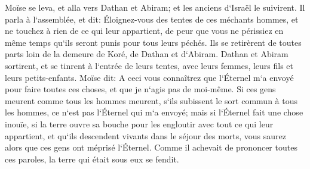 \verse Moïse se leva, et alla vers Dathan et Abiram; et les anciens d`Israël le suivirent. 
\verse Il parla à l`assemblée, et dit: Éloignez-vous des tentes de ces méchants hommes, et ne touchez à rien de ce qui leur appartient, de peur que vous ne périssiez en même temps qu`ils seront punis pour tous leurs péchés. 
\verse Ils se retirèrent de toutes parts loin de la demeure de Koré, de Dathan et d`Abiram. Dathan et Abiram sortirent, et se tinrent à l`entrée de leurs tentes, avec leurs femmes, leurs fils et leurs petits-enfants. 
\verse Moïse dit: A ceci vous connaîtrez que l`Éternel m`a envoyé pour faire toutes ces choses, et que je n`agis pas de moi-même. 
\verse Si ces gens meurent comme tous les hommes meurent, s`ils subissent le sort commun à tous les hommes, ce n`est pas l`Éternel qui m`a envoyé; 
\verse mais si l`Éternel fait une chose inouïe, si la terre ouvre sa bouche pour les engloutir avec tout ce qui leur appartient, et qu`ils descendent vivants dans le séjour des morts, vous saurez alors que ces gens ont méprisé l`Éternel. 
\verse Comme il achevait de prononcer toutes ces paroles, la terre qui était sous eux se fendit. 
